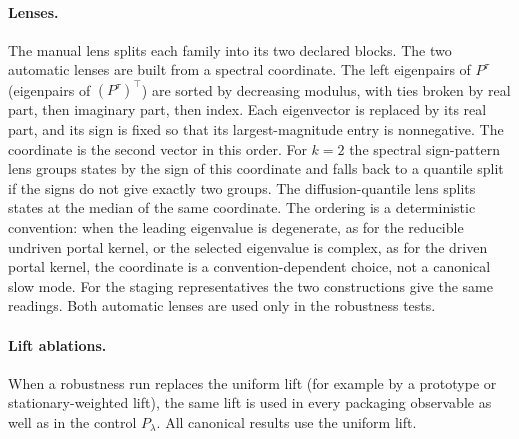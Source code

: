 \paragraph{Lenses.} The manual lens splits each family into its two declared blocks. The two automatic lenses are built from a spectral coordinate. The left eigenpairs of $P^{\tau}$ (eigenpairs of $(P^{\tau})^{\top}$) are sorted by decreasing modulus, with ties broken by real part, then imaginary part, then index. Each eigenvector is replaced by its real part, and its sign is fixed so that its largest-magnitude entry is nonnegative. The coordinate is the second vector in this order. For $k=2$ the spectral sign-pattern lens groups states by the sign of this coordinate and falls back to a quantile split if the signs do not give exactly two groups. The diffusion-quantile lens splits states at the median of the same coordinate. The ordering is a deterministic convention: when the leading eigenvalue is degenerate, as for the reducible undriven portal kernel, or the selected eigenvalue is complex, as for the driven portal kernel, the coordinate is a convention-dependent choice, not a canonical slow mode. For the staging representatives the two constructions give the same readings. Both automatic lenses are used only in the robustness tests.

\paragraph{Lift ablations.} When a robustness run replaces the uniform lift (for example by a prototype or stationary-weighted lift), the same lift is used in every packaging observable as well as in the control $P_\lambda$. All canonical results use the uniform lift.
